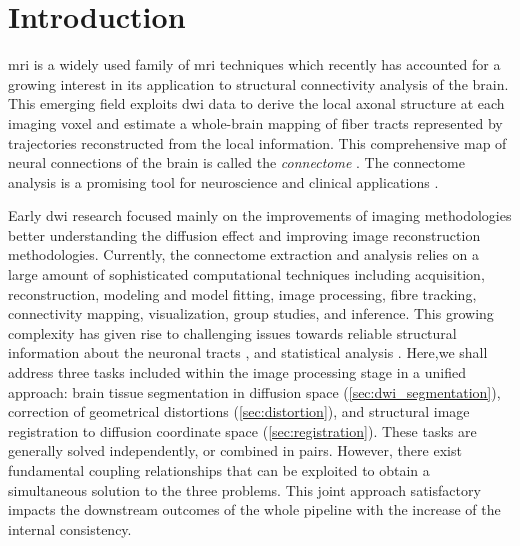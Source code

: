 \section{Introduction}
\label{sec:introduction}
% 
% 
% 
% 
%
 \gls{mri} is a widely used family
of \gls{mri} techniques \citep{sundgren_diffusion_2004} which recently 
has accounted for a growing interest in its application to structural 
connectivity analysis of the brain. This emerging field exploits
\gls{dwi} data to derive the local axonal structure at each imaging voxel 
\citep{basser_microstructural_2011} and estimate a whole-brain mapping of fiber 
tracts represented by trajectories reconstructed from the local information.
This comprehensive map of neural connections of the brain is called the 
\emph{connectome} \citep{hagmann_diffusion_2005,sporns_human_2005}. The connectome
analysis is a promising tool for neuroscience and clinical applications
\citep{griffa_structural_2013}.


Early \gls{dwi} research focused mainly on the improvements of imaging 
methodologies better understanding the diffusion effect and improving
image reconstruction methodologies. Currently, the connectome extraction 
and analysis relies on a large amount of sophisticated computational techniques
\citep{daducci_connectome_2012,hagmann_mr_2012} including acquisition,
reconstruction, modeling and model fitting, image processing, fibre tracking,
connectivity mapping, visualization, group studies, and inference. This 
growing complexity has given rise to challenging issues towards reliable 
structural information about the neuronal tracts \cite{johansen-berg_using_2009,
jones_white_2012,soares_hitchhikers_2013}, and statistical analysis 
\citep{meskaldji_comparing_2013}. Here,we shall address three tasks included within 
the image processing stage in a unified approach: brain tissue segmentation in 
diffusion space (\autoref{sec:dwi_segmentation}), correction of geometrical 
distortions (\autoref{sec:distortion}), and structural image registration to 
diffusion coordinate space (\autoref{sec:registration}). These tasks are generally
solved independently, or combined in pairs. However, there exist fundamental 
coupling relationships that can be exploited to obtain a simultaneous solution to 
the three problems. This joint approach satisfactory impacts the downstream
outcomes of the whole pipeline with the increase of the internal consistency.

